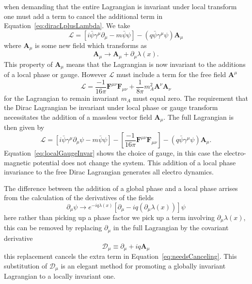 when demanding that the entire Lagrangian is invariant under local transform 
one must add a term to cancel the additional term in 
Equation~\eqref{eq:diracLplusLambda}. We take
\begin{equation}
  \mathcal{L} = \left[i\bar{\psi}\gamma^{\mu}\partial_{\mu} - m \bar{\psi}\psi\right] - \left(q\bar{\psi}\gamma^{\mu}\psi\right)\bm{A}_{\mu}
\end{equation}
where $\bm{A}_{\mu}$ is some new field which transforms as
\begin{equation}
  \bm{A}_{\mu}\rightarrow \bm{A}_{\mu} + \partial_{\mu}\lambda(x).
  \label{eq:localGaugeInvar}
\end{equation}
This property of $\bm{A}_{\mu}$ means that the Lagrangian is now invariant to 
the additions of a local phase or gauge. However $\mathcal{L}$ must include a 
term for the free field $\bm{A}^{\mu}$
\begin{equation}
  \mathcal{L} = \frac{-1}{16\pi}\bm{F}^{\mu\nu}\bm{F}_{\mu\nu} + \frac{1}{8\pi}m_{A}^{2}\bm{A}^{\nu}\bm{A}_{\nu}
\end{equation}
for the Lagrangian to remain invariant $m_{A}$ must equal zero. The requirement 
that the Dirac Lagrangian be invariant under local phase or gauge transform 
necessitates the addition of a massless vector field $\bm{A}_{\mu}$. The full Lagrangian is then given by
\begin{equation}
  \mathcal{L} = \left[i\bar{\psi}\gamma^{\mu}\partial_{\mu}\psi - m \bar{\psi}\psi\right] - \left[\frac{-1}{16\pi}\bm{F}^{\mu\nu}\bm{F}_{\mu\nu}\right] - \left(q\bar{\psi}\gamma^{\mu}\psi\right)\bm{A}_{\mu}.
\end{equation}
Equation~\eqref{eq:localGaugeInvar} shows the choice of gauge, in this case the 
electro-magnetic potential does not change the system. This addition of a local 
phase invariance to the free Dirac Lagrangian generates all electro dynamics.

The difference between the addition of a global phase and a local phase arrises 
from the calculation of the derivatives of the fields
\begin{equation}
  \partial_{\mu}\psi\rightarrow e^{-iq\lambda(x)}\left[\partial_{\mu}- iq\left(\partial_{\mu}\lambda(x)\right)\right]\psi
  \label{eq:needsCanceling}
\end{equation}
here rather than picking up a phase factor we pick up a term involving 
$\partial_{\mu}\lambda(x)$, this can be removed by replacing $\partial_{\mu}$ 
in the full Lagrangian by the covariant derivative
\begin{equation}
  \mathcal{D}_{\mu} \equiv \partial_{\mu} + iq\bm{A}_{\mu}
\end{equation}
this replacement cancels the extra term in Equation~\eqref{eq:needsCanceling}. 
This substitution of $\mathcal{D}_{\mu}$ is an elegant method for promoting a 
globally invariant Lagrangian to a locally invariant one.

